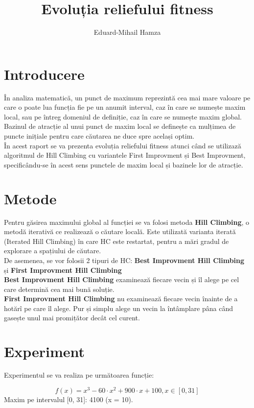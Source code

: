 \documentclass{article}
\author{Eduard-Mihail Hamza}
\title{Evoluția reliefului fitness}
\begin{document}
\maketitle

\section{Introducere}
În analiza matematică, un punct de maximum reprezintă cea mai mare valoare pe care o poate lua funcția fie pe un anumit interval, caz în care se numește maxim local, sau pe întreg domeniul de definiție, caz în care se numește maxim global.\\
Bazinul de atracție al unui punct de maxim local se definește ca mulțimea de puncte inițiale pentru care căutarea ne duce spre același optim.\\
În acest raport se va prezenta evoluția reliefului fitness atunci când se utilizază algoritmul de Hill Climbing cu variantele First Improvment și Best Improvment, specificându-se în acest sens punctele de maxim local și bazinele lor de atracție.

\section{Metode}
Pentru găsirea maximului global al funcției se va folosi metoda
\textbf{Hill Climbing}, o metodă iterativă ce realizează o căutare locală. Este utilizată varianta iterată (Iterated Hill Climbing) în care HC este restartat, pentru a mări gradul de explorare a spațiului de căutare.\\
De asemenea, se vor folosii 2 tipuri de HC:  \textbf{Best Improvment Hill Climbing} și \textbf{First Improvment Hill Climbing}\\
\textbf{Best Improvment Hill Climbing} examinează fiecare vecin și îl alege pe cel care determină cea mai bună soluție.\\
\textbf{First Improvment Hill Climbing} nu examinează fiecare vecin înainte de a hotărî pe care îl alege. Pur și simplu alege un vecin la întâmplare pâna când gasește unul mai promițător decât cel curent.\\



\section{Experiment}
Experimentul se va realiza pe următoarea funcție:

$$ f(x) = x^{3} - 60 \cdot x^{2} + 900 \cdot x + 100, x \in [0, 31]$$
Maxim pe intervalul [0, 31]: 4100 (x = 10).
\end{document}
